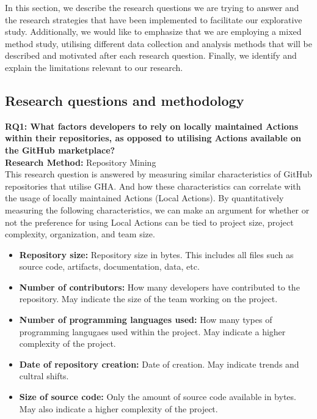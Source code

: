 \documentclass[conference]{IEEEtran}
\begin{document}
    In this section, we describe the research questions we are trying to answer and the research strategies that have been implemented to facilitate our explorative study. Additionally, we would like to emphasize that we are employing a mixed method study, utilising different data collection and analysis methods that will be described and motivated after each research question. Finally, we identify and explain the limitations relevant to our research.

    \subsection{Research questions and methodology}
        \textbf{RQ1: What factors developers to rely on locally maintained Actions within their repositories, as opposed to utilising Actions available on the GitHub marketplace?}
        \\

        \textbf{Research Method:}  Repository Mining \\
          This research question is answered by measuring similar characteristics of GitHub repositories that utilise GHA. And how these characteristics can correlate with the usage of locally maintained Actions (Local Actions). By quantitatively measuring the following characteristics, we can make an argument for whether or not the preference for using Local Actions can be tied to project size, project complexity, organization, and team size. \\
          \begin{itemize}
            \item \textbf{Repository size:} Repository size in bytes. This includes all files such as source code, artifacts, documentation, data, etc.
            \item \textbf{Number of contributors:} How many developers have contributed to the repository. May indicate the size of the team working on the project.
            \item	\textbf{Number of programming languages used:} How many types of programming langugaes used within the project. May indicate a higher complexity of the project.
            \item \textbf{Date of repository creation:} Date of creation. May indicate trends and cultral shifts.\\
            \item \textbf{Size of source code:} Only the amount of source code available in bytes. May also indicate a higher complexity of the project. \\
          \end{itemize}
          
\end{document}
